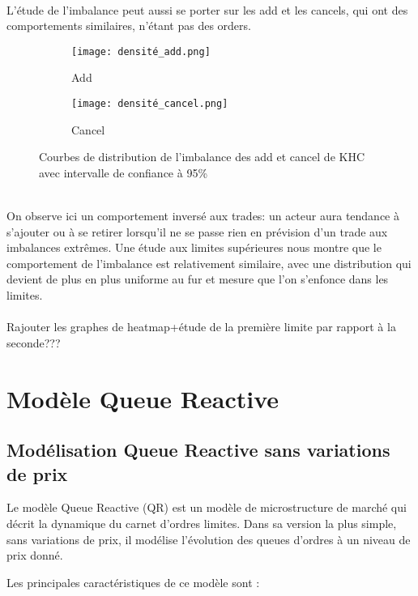 \documentclass[12pt,a4paper]{article}
\theoremstyle{definition}
\theoremstyle{remark}
\begin{document}
\\
L'étude de l'imbalance peut aussi se porter sur les add et les cancels, qui ont des comportements similaires, n'étant pas des orders.
\begin{figure}[h!]
    \centering
    \begin{subfigure}[b]{0.48\textwidth}
        \centering
        \texttt{[image: densité\_add.png]}
        \caption{Add}
        \label{fig:imbalance}
    \end{subfigure}
    \hfill
    \begin{subfigure}[b]{0.48\textwidth}
        \centering
        \texttt{[image: densité\_cancel.png]}
        \caption{Cancel}
        \label{fig:densite_imbalance}
    \end{subfigure}
    \caption{Courbes de distribution de l'imbalance des add et cancel de KHC avec intervalle de confiance à 95\%}
    \label{fig:comparison}
\end{figure}
\\
On observe ici un comportement inversé aux trades: un acteur aura tendance à s'ajouter ou à se retirer lorsqu'il ne se passe rien en prévision d'un trade aux imbalances extrêmes. Une étude aux limites supérieures nous montre que le comportement de l'imbalance est relativement similaire, avec une distribution qui devient de plus en plus uniforme au fur et mesure que l'on s'enfonce dans les limites.
\\
\\
Rajouter les graphes de heatmap+étude de la première limite par rapport à la seconde???




\newpage
\section{Modèle Queue Reactive}

\subsection{Modélisation Queue Reactive sans variations de prix}

Le modèle Queue Reactive (QR) est un modèle de microstructure de marché qui décrit la dynamique du carnet d'ordres limites. Dans sa version la plus simple, sans variations de prix, il modélise l'évolution des queues d'ordres à un niveau de prix donné.

Les principales caractéristiques de ce modèle sont :
\end{document}
